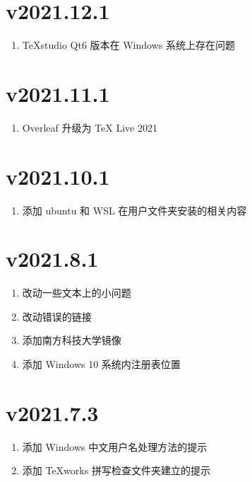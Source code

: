 \section*{v2021.12.1}

\begin{enumerate}
  \item \TeX studio Qt6 版本在 Windows 系统上存在问题
\end{enumerate}

\section*{v2021.11.1}

\begin{enumerate}
  \item Overleaf 升级为 \TeX{} Live 2021
\end{enumerate}

\section*{v2021.10.1}

\begin{enumerate}
  \item 添加 ubuntu 和 WSL 在用户文件夹安装的相关内容
\end{enumerate}

\section*{v2021.8.1}

\begin{enumerate}
  \item 改动一些文本上的小问题
  \item 改动错误的链接
  \item 添加南方科技大学镜像
  \item 添加 Windows 10 系统内注册表位置
\end{enumerate}

\section*{v2021.7.3}

\begin{enumerate}
  \item 添加 Windows 中文用户名处理方法的提示
  \item 添加 \TeX works 拼写检查文件夹建立的提示
\end{enumerate}

